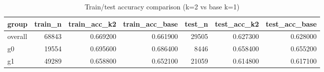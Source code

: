 \begin{table}
\caption{Train/test accuracy comparison (k=2 vs base k=1)}
\label{tab:accuracy_k2}
\begin{tabular}{lrrrrrr}
\toprule
group & train_n & train_acc_k2 & train_acc_base & test_n & test_acc_k2 & test_acc_base \\
\midrule
overall & 68843 & 0.669200 & 0.661900 & 29505 & 0.627300 & 0.628000 \\
g0 & 19554 & 0.695600 & 0.686400 & 8446 & 0.658400 & 0.655200 \\
g1 & 49289 & 0.658800 & 0.652100 & 21059 & 0.614800 & 0.617100 \\
\bottomrule
\end{tabular}
\end{table}
